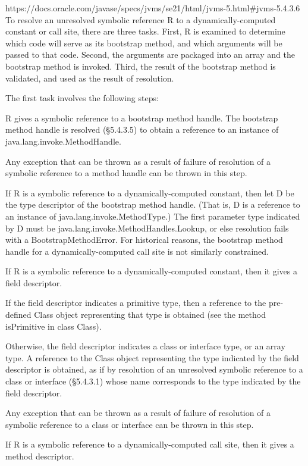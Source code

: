 https://docs.oracle.com/javase/specs/jvms/se21/html/jvms-5.html#jvms-5.4.3.6
To resolve an unresolved symbolic reference R to a dynamically-computed constant or call site, there are three tasks. First, R is examined to determine which code will serve as its bootstrap method, and which arguments will be passed to that code. Second, the arguments are packaged into an array and the bootstrap method is invoked. Third, the result of the bootstrap method is validated, and used as the result of resolution.

The first task involves the following steps:

    R gives a symbolic reference to a bootstrap method handle. The bootstrap method handle is resolved (§5.4.3.5) to obtain a reference to an instance of java.lang.invoke.MethodHandle.

    Any exception that can be thrown as a result of failure of resolution of a symbolic reference to a method handle can be thrown in this step.

    If R is a symbolic reference to a dynamically-computed constant, then let D be the type descriptor of the bootstrap method handle. (That is, D is a reference to an instance of java.lang.invoke.MethodType.) The first parameter type indicated by D must be java.lang.invoke.MethodHandles.Lookup, or else resolution fails with a BootstrapMethodError. For historical reasons, the bootstrap method handle for a dynamically-computed call site is not similarly constrained.

    If R is a symbolic reference to a dynamically-computed constant, then it gives a field descriptor.

    If the field descriptor indicates a primitive type, then a reference to the pre-defined Class object representing that type is obtained (see the method isPrimitive in class Class).

    Otherwise, the field descriptor indicates a class or interface type, or an array type. A reference to the Class object representing the type indicated by the field descriptor is obtained, as if by resolution of an unresolved symbolic reference to a class or interface (§5.4.3.1) whose name corresponds to the type indicated by the field descriptor.

    Any exception that can be thrown as a result of failure of resolution of a symbolic reference to a class or interface can be thrown in this step.

    If R is a symbolic reference to a dynamically-computed call site, then it gives a method descriptor.

